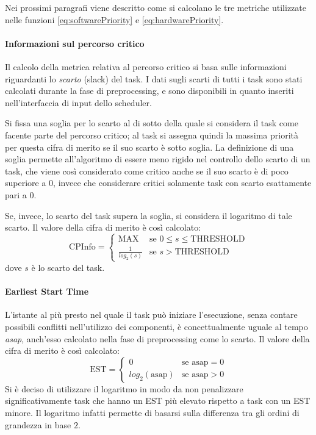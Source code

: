 Nei prossimi paragrafi viene descritto come si calcolano le tre metriche 
utilizzate nelle funzioni \ref{eq:softwarePriority} e \ref{eq:hardwarePriority}.

\paragraph{Informazioni sul percorso critico}
Il calcolo della metrica relativa al percorso critico si basa sulle 
informazioni riguardanti lo \emph{scarto} (slack) del task. I dati sugli 
scarti di tutti i task sono stati calcolati durante la fase di preprocessing, 
e sono disponibili in quanto inseriti nell'interfaccia di input dello scheduler.

Si fissa una soglia per lo scarto al di sotto della quale si considera il task 
come facente parte del percorso critico; al task si assegna quindi la massima 
priorità per questa cifra di merito se il suo scarto è sotto soglia. La 
definizione di una soglia permette all'algoritmo di essere meno rigido nel 
controllo dello scarto di un task, che viene così considerato come critico anche 
se il suo scarto è di poco superiore a $0$, invece che considerare critici 
solamente task con scarto esattamente pari a $0$.

Se, invece, lo scarto del task supera la soglia, si considera il logaritmo di 
tale scarto. Il valore della cifra di merito è così calcolato:
\begin{equation}
  \text{CPInfo} = \begin{cases}
    \text{MAX} & \mbox{se } 0 \leq s \leq \text{THRESHOLD}\\
    \frac{1}{log_2\left(s\right)} & \mbox{se } s > \text{THRESHOLD}
          \end{cases}
\end{equation}
dove $s$ è lo scarto del task.

\paragraph{Earliest Start Time}
L'istante al più presto nel quale il task può iniziare l'esecuzione, senza 
contare possibili conflitti nell'utilizzo dei componenti, è concettualmente 
uguale al tempo \emph{asap}, anch'esso calcolato nella fase di preprocessing 
come lo scarto. Il valore della cifra di merito è così calcolato:
\begin{equation}
  \text{EST} = \begin{cases}
    0 & \mbox{se } \text{asap} = 0\\
    log_2\left(\text{asap}\right) & \mbox{se } \text{asap} > 0
       \end{cases}
\end{equation}
Si è deciso di utilizzare il logaritmo in modo da non penalizzare 
significativamente task che hanno un EST più elevato rispetto a task con un EST 
minore. Il logaritmo infatti permette di basarsi sulla differenza tra gli ordini 
di grandezza in base $2$.

